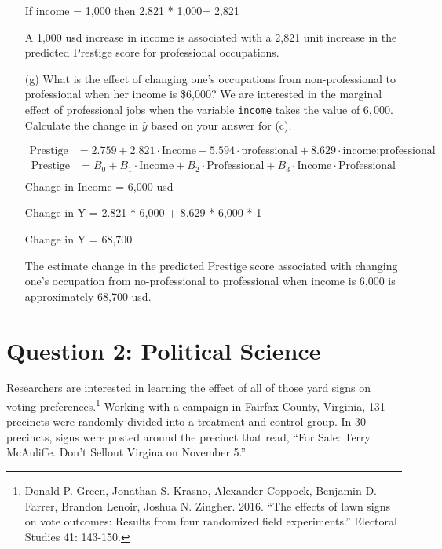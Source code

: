 \documentclass[12pt,letterpaper]{article}
\begin{document}
\begin{enumerate}
	If income = 1,000 then 2.821 * 1,000= 2,821
	
	A 1,000 usd increase in income is associated with a 2,821 unit increase in the predicted Prestige score
	for professional occupations. 			
	\vspace{1cm}
	
	\newpage
	
	\item [(g)]
	What is the effect of changing one's occupations from non-professional to professional when her income is \$6,000? We are interested in the marginal effect of professional jobs when the variable \texttt{income} takes the value of $6,000$. Calculate the change in $\hat{y}$ based on your answer for (c).
	
	\begin{align*}
		\text{Prestige} &= 2.759 + 2.821 \cdot \text{Income} - 5.594 \cdot \text{professional} + 8.629 \cdot \text{income:professional}	
	\end{align*}
	\begin{align*}
			\text{Prestige} &= B_0 + B_1 \cdot \text{Income} + B_2 \cdot \text{Professional} + B_3 \cdot \text{Income} \cdot \text{Professional} \\
	\end{align*}
	Change in Income = 6,000 usd
	
	Change in Y = 2.821 * 6,000 + 8.629 * 6,000 * 1 
	
	Change in Y = 68,700

	The estimate change in the predicted Prestige score associated with changing one's occupation from 
	no-professional to professional when income is 6,000 is approximately 68,700 usd. 
	
\end{enumerate}

\newpage

\section*{Question 2: Political Science}
\vspace{.25cm}
\noindent 	Researchers are interested in learning the effect of all of those yard signs on voting preferences.\footnote{Donald P. Green, Jonathan	S. Krasno, Alexander Coppock, Benjamin D. Farrer,	Brandon Lenoir, Joshua N. Zingher. 2016. ``The effects of lawn signs on vote outcomes: Results from four randomized field experiments.'' Electoral Studies 41: 143-150. } Working with a campaign in Fairfax County, Virginia, 131 precincts were randomly divided into a treatment and control group. In 30 precincts, signs were posted around the precinct that read, ``For Sale: Terry McAuliffe. Don't Sellout Virgina on November 5.'' \\
\end{document}
